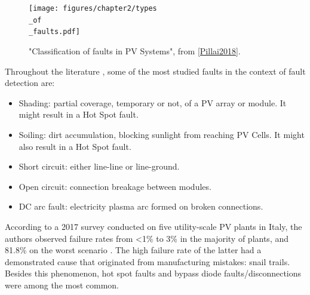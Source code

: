 \begin{figure}[h]
    \centering
    \texttt{[image: figures/chapter2/types\\\_of\\\_faults.pdf]} \caption{"Classification of
    faults in PV Systems", from \ref{Pillai2018}.}
    \label{fig:faults}
\end{figure}

Throughout the literature \cite{Braun2011}, some of the most studied faults in the context of fault detection are:

\begin{itemize}
    \item Shading: partial coverage, temporary or not, of a PV array or module. It might result in a Hot Spot fault.
    \item Soiling: dirt accumulation, blocking sunlight from reaching PV Cells. It might also result in a Hot Spot fault.
    \item Short circuit: either line-line or line-ground.
    \item Open circuit: connection breakage between modules.
    \item DC arc fault: electricity plasma arc formed on broken connections.
\end{itemize}

According to a 2017 survey conducted on five utility-scale PV plants in Italy, the authors observed failure rates from
<1\% to 3\% in the majority of plants, and 81.8\% on the worst scenario \cite{Grimaccia2017}. The high failure rate of
the latter had a demonstrated cause that originated from manufacturing mistakes: snail trails. Besides this phenomenon,
hot spot faults and bypass diode faults/disconnections were among the most common.

